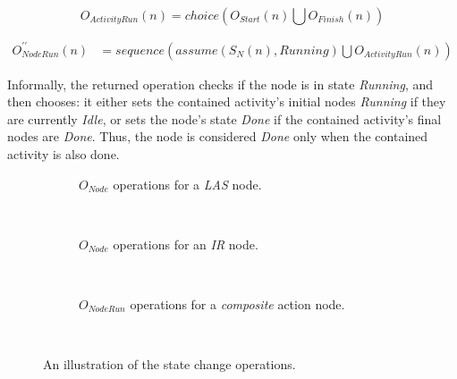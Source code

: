 \begin{definition}
	\begin{equation*}
		O_\mathit{ActivityRun}(n) = \mathit{choice}\left(O_\mathit{Start}(n) \bigcup O_\mathit{Finish}(n)\right)
	\end{equation*}
	
	\begin{align*}
		O_\mathit{NodeRun}^{\prime\prime}(n) &= \mathit{sequence}\left(\mathit{assume}(S_N(n), \mathit{Running}) \bigcup O_\mathit{ActivityRun}(n)\right)
	\end{align*}

	Informally, the returned operation checks if the node is in state \emph{Running}, and then chooses: it either sets the contained activity's initial nodes \emph{Running} if they are currently \emph{Idle}, or sets the node's state \emph{Done} if the contained activity's final nodes are \emph{Done}. Thus, the node is considered \emph{Done} only when the contained activity is also done.

\end{definition}

\begin{figure}[!ht]
\centering
\begin{subfigure}[b]{\textwidth}
	\centering
	
	\caption{\(O_\mathit{Node}\) operations for a \emph{LAS} node.}
	\label{fig:activity-state-function-las}
\end{subfigure}\\
\vspace{10mm}
\begin{subfigure}[b]{\textwidth}
	\centering
	
	\caption{\(O_\mathit{Node}\) operations for an \emph{IR} node.}
	\label{fig:activity-state-function-ir}
\end{subfigure}\\
\vspace{10mm}
\begin{subfigure}[b]{\textwidth}
	\centering
	
	\caption{\(O_\mathit{NodeRun}\) operations for a \emph{composite} action node.}
	\label{fig:activity-state-function-composite}
\end{subfigure}\\
\caption{An illustration of the state change operations.}
\label{fig:activity-state-functions}
\end{figure}

